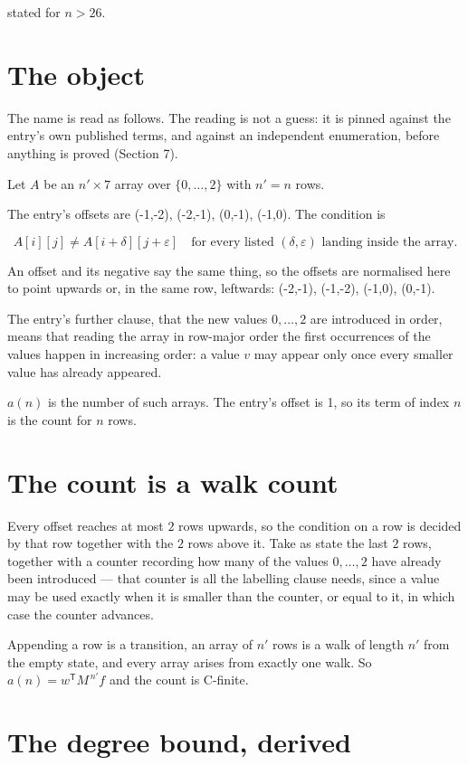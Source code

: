 \documentclass[11pt]{article}
\theoremstyle{definition}
\begin{document}
stated for $n > 26$.

\section{The object}

The name is read as follows. The reading is not a guess: it is pinned against the entry's own published terms, and against an independent enumeration, before anything is proved (Section 7).

Let $A$ be an $n' \times 7$ array over $\{0,\dots,2\}$ with $n' = n$ rows.

The entry's offsets are (-1,-2), (-2,-1), (0,-1), (-1,0). The condition is

\[A[i][j] \ne A[i{+}\delta][j{+}\varepsilon]\quad\text{for every listed }(\delta,\varepsilon)\text{ landing inside the array.}\]

An offset and its negative say the same thing, so the offsets are normalised here to point upwards or, in the same row, leftwards: (-2,-1), (-1,-2), (-1,0), (0,-1).

The entry's further clause, that the new values $0,\dots,2$ are introduced in order, means that reading the array in row-major order the first occurrences of the values happen in increasing order: a value $v$ may appear only once every smaller value has already appeared.

$a(n)$ is the number of such arrays. The entry's offset is 1, so its term of index $n$ is the count for $n$ rows.

\section{The count is a walk count}

Every offset reaches at most $2$ rows upwards, so the condition on a row is decided by that row together with the $2$ rows above it. Take as state the last $2$ rows, together with a counter recording how many of the values $0,\dots,2$ have already been introduced --- that counter is all the labelling clause needs, since a value may be used exactly when it is smaller than the counter, or equal to it, in which case the counter advances.

Appending a row is a transition, an array of $n'$ rows is a walk of length $n'$ from the empty state, and every array arises from exactly one walk. So $a(n) = w^{\mathsf T}M^{\,n'}f$ and the count is C-finite.

\section{The degree bound, derived}
\end{document}
